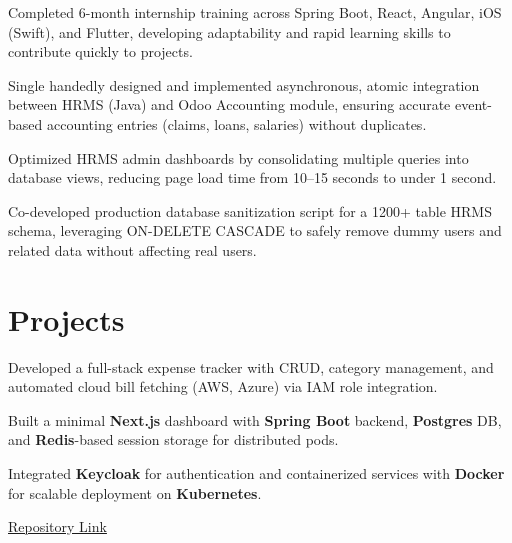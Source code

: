\documentclass[]{deedy-resume-reversed}
\begin{document}
\begin{minipage}[t]{0.60\textwidth}
\begin{tightemize}
\item Completed 6-month internship training across Spring Boot, React, Angular, iOS (Swift), and Flutter, developing adaptability and rapid learning skills to contribute quickly to projects.
\item Single handedly designed and implemented asynchronous, atomic integration between HRMS (Java) and Odoo Accounting module, ensuring accurate event-based accounting entries (claims, loans, salaries) without duplicates.


\item Optimized HRMS admin dashboards by consolidating multiple queries into database views, reducing page load time from 10–15 seconds to under 1 second.
\item Co-developed production database sanitization script for a 1200+ table HRMS schema, leveraging ON-DELETE CASCADE to safely remove dummy users and related data without affecting real users.
\end{tightemize}
\sectionsep





\section{Projects}
\begin{tightemize}
\item Developed a full-stack expense tracker with CRUD, category management, and automated cloud bill fetching (AWS, Azure) via IAM role integration.
\item Built a minimal \textbf{Next.js} dashboard with \textbf{Spring Boot} backend, \textbf{Postgres} DB, and \textbf{Redis}-based session storage for distributed pods.
\item Integrated \textbf{Keycloak} for authentication and containerized services with \textbf{Docker} for scalable deployment on \textbf{Kubernetes}.
\item \href{https://github.com/JayBhensdadia/munimjii}{Repository Link}
\end{tightemize}
\sectionsep






\end{minipage}
\end{document}
